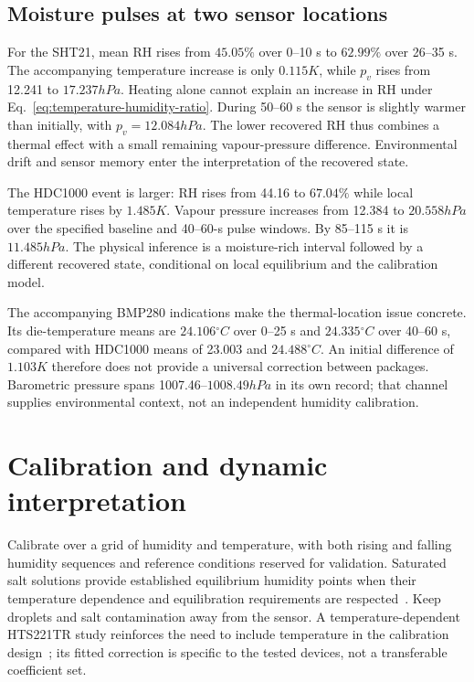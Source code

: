 \subsection{Moisture pulses at two sensor locations}
For the SHT21, mean RH rises from $45.05\%$ over 0--10 s to $62.99\%$ over 26--35 s. The accompanying temperature increase is only $0.115\unit{K}$, while $p_v$ rises from 12.241 to $17.237\unit{hPa}$. Heating alone cannot explain an increase in RH under Eq.~\eqref{eq:temperature-humidity-ratio}. During 50--60 s the sensor is slightly warmer than initially, with $p_v=12.084\unit{hPa}$. The lower recovered RH thus combines a thermal effect with a small remaining vapour-pressure difference. Environmental drift and sensor memory enter the interpretation of the recovered state.

The HDC1000 event is larger: RH rises from 44.16 to $67.04\%$ while local temperature rises by $1.485\unit{K}$. Vapour pressure increases from 12.384 to $20.558\unit{hPa}$ over the specified baseline and 40--60-s pulse windows. By 85--115 s it is $11.485\unit{hPa}$. The physical inference is a moisture-rich interval followed by a different recovered state, conditional on local equilibrium and the calibration model.

The accompanying BMP280 indications make the thermal-location issue concrete. Its die-temperature means are $24.106\unit{^\circ C}$ over 0--25 s and $24.335\unit{^\circ C}$ over 40--60 s, compared with HDC1000 means of 23.003 and $24.488\unit{^\circ C}$. An initial difference of $1.103\unit{K}$ therefore does not provide a universal correction between packages. Barometric pressure spans 1007.46--$1008.49\unit{hPa}$ in its own record; that channel supplies environmental context, not an independent humidity calibration.

\section{Calibration and dynamic interpretation}
Calibrate over a grid of humidity and temperature, with both rising and falling humidity sequences and reference conditions reserved for validation. Saturated salt solutions provide established equilibrium humidity points when their temperature dependence and equilibration requirements are respected~\cite{greenspan1977}. Keep droplets and salt contamination away from the sensor. A temperature-dependent HTS221TR study reinforces the need to include temperature in the calibration design~\cite{holik2024}; its fitted correction is specific to the tested devices, not a transferable coefficient set.


